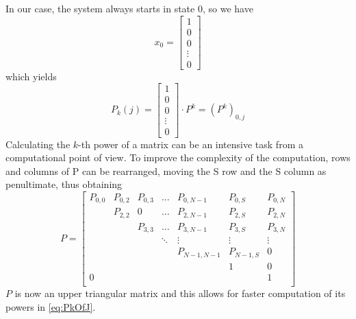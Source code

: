 In our case, the system always starts in state 0, so we have
\begin{equation*}
x_{0} = 
\begin{bmatrix}
1 \\
0 \\
0 \\
\vdots \\
0
\end{bmatrix}
\label{initialStateVector}
\end{equation*}
which yields
\begin{equation}
P_{k}(j) = 
\begin{bmatrix}
1 \\
0 \\
0 \\
\vdots \\
0
\end{bmatrix}
\cdot P^{k} = (P^{k})_{0,j}
\label{eq:PkOfJ}
\end{equation}
Calculating the $k$-th power of a matrix can be an intensive task from a
computational point of view. To improve the complexity of the computation, rows
and columns of P can be rearranged, moving the S row and the S column as
penultimate, thus obtaining
\begin{equation*}
P = 
\begin{bmatrix}
P_{0,0}	& P_{0,2}	& P_{0,3}  	& \dots	& P_{0, N-1}	& P_{0,S}	& P_{0,N} \\
		& P_{2,2}	& 0  	& \dots	& P_{2, N-1}	& P_{2,S}	& P_{2,N} \\
		& 			& P_{3,3}	& \dots	& P_{3, N-1}	& P_{3,S}	& P_{3,N} \\
 		& 			& 			& \ddots& \vdots		& \vdots	& \vdots \\
		& 			& 			& 		& P_{N-1,N-1}	& P_{N-1,S}	& 0\\
		& 			& 			& 		& 				& 1			& 0		 \\
0		& 			& 		  	& 		& 				& 			& 1		 \\
\end{bmatrix}
\label{triangularPMatrix}
\end{equation*}
$P$ is now an upper triangular matrix and this allows for faster computation of
its powers in \ref{eq:PkOfJ}.
